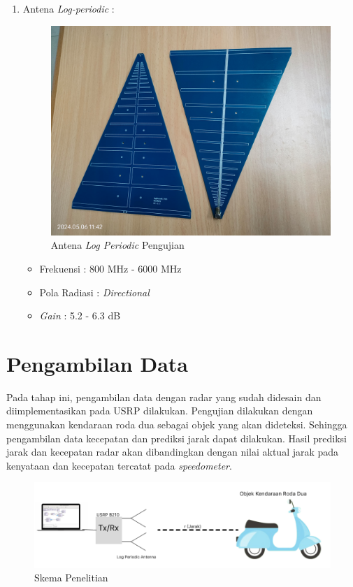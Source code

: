 \begin{enumerate}
	\item Antena \textit{Log-periodic} :
	\begin{figure}
		\begin{center}
			\includegraphics[scale=0.05]{pics/bab3/logPeriodic.jpg}
			\caption{Antena \textit{Log Periodic} Pengujian}
			\label{img:usrpBoard}
		\end{center}
	\end{figure}
	\begin{itemize}
		\item Frekuensi : 800 MHz - 6000 MHz 
		\item Pola Radiasi : \textit{Directional}
		\item \textit{Gain} : 5.2 - 6.3 dB
	\end{itemize}
\end{enumerate}

	
\section{Pengambilan Data}
Pada tahap ini, pengambilan data dengan radar yang sudah didesain dan diimplementasikan pada USRP dilakukan. Pengujian dilakukan dengan menggunakan kendaraan roda dua sebagai objek yang akan dideteksi. Sehingga pengambilan data kecepatan dan prediksi jarak dapat dilakukan. Hasil prediksi jarak dan kecepatan radar akan dibandingkan dengan nilai aktual jarak pada kenyataan dan kecepatan tercatat pada \textit{speedometer}.

\begin{figure}
	\begin{center}
		\includegraphics[scale=0.55]{pics/bab3/skema.png}
		\caption{Skema Penelitian}
		\label{img:skema}
	\end{center}
\end{figure}

